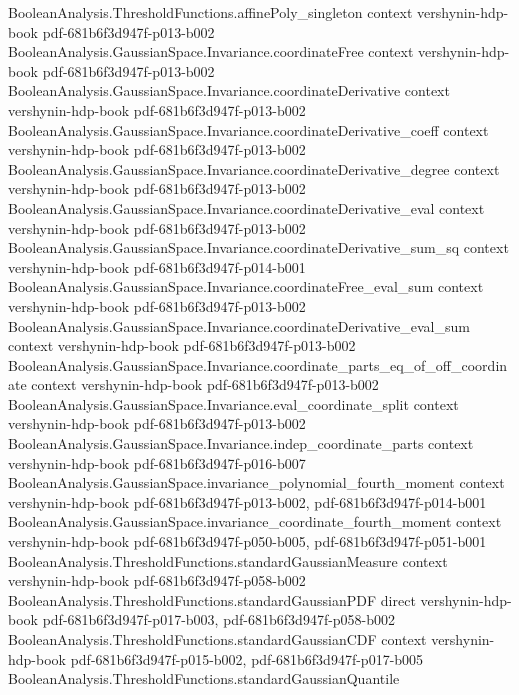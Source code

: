 \begin{theorem}
  {BooleanAnalysis.ThresholdFunctions.affinePoly_singleton}
  {context}
  {vershynin-hdp-book}
  {pdf-681b6f3d947f-p013-b002}
\proofstep
  {BooleanAnalysis.GaussianSpace.Invariance.coordinateFree}
  {context}
  {vershynin-hdp-book}
  {pdf-681b6f3d947f-p013-b002}
\proofstep
  {BooleanAnalysis.GaussianSpace.Invariance.coordinateDerivative}
  {context}
  {vershynin-hdp-book}
  {pdf-681b6f3d947f-p013-b002}
\proofstep
  {BooleanAnalysis.GaussianSpace.Invariance.coordinateDerivative_coeff}
  {context}
  {vershynin-hdp-book}
  {pdf-681b6f3d947f-p013-b002}
\proofstep
  {BooleanAnalysis.GaussianSpace.Invariance.coordinateDerivative_degree}
  {context}
  {vershynin-hdp-book}
  {pdf-681b6f3d947f-p013-b002}
\proofstep
  {BooleanAnalysis.GaussianSpace.Invariance.coordinateDerivative_eval}
  {context}
  {vershynin-hdp-book}
  {pdf-681b6f3d947f-p013-b002}
\proofstep
  {BooleanAnalysis.GaussianSpace.Invariance.coordinateDerivative_sum_sq}
  {context}
  {vershynin-hdp-book}
  {pdf-681b6f3d947f-p014-b001}
\proofstep
  {BooleanAnalysis.GaussianSpace.Invariance.coordinateFree_eval_sum}
  {context}
  {vershynin-hdp-book}
  {pdf-681b6f3d947f-p013-b002}
\proofstep
  {BooleanAnalysis.GaussianSpace.Invariance.coordinateDerivative_eval_sum}
  {context}
  {vershynin-hdp-book}
  {pdf-681b6f3d947f-p013-b002}
\proofstep
  {BooleanAnalysis.GaussianSpace.Invariance.coordinate_parts_eq_of_off_coordinate}
  {context}
  {vershynin-hdp-book}
  {pdf-681b6f3d947f-p013-b002}
\proofstep
  {BooleanAnalysis.GaussianSpace.Invariance.eval_coordinate_split}
  {context}
  {vershynin-hdp-book}
  {pdf-681b6f3d947f-p013-b002}
\proofstep
  {BooleanAnalysis.GaussianSpace.Invariance.indep_coordinate_parts}
  {context}
  {vershynin-hdp-book}
  {pdf-681b6f3d947f-p016-b007}
\proofstep
  {BooleanAnalysis.GaussianSpace.invariance_polynomial_fourth_moment}
  {context}
  {vershynin-hdp-book}
  {pdf-681b6f3d947f-p013-b002,
    pdf-681b6f3d947f-p014-b001}
\proofstep
  {BooleanAnalysis.GaussianSpace.invariance_coordinate_fourth_moment}
  {context}
  {vershynin-hdp-book}
  {pdf-681b6f3d947f-p050-b005,
    pdf-681b6f3d947f-p051-b001}
\proofstep
  {BooleanAnalysis.ThresholdFunctions.standardGaussianMeasure}
  {context}
  {vershynin-hdp-book}
  {pdf-681b6f3d947f-p058-b002}
\proofstep
  {BooleanAnalysis.ThresholdFunctions.standardGaussianPDF}
  {direct}
  {vershynin-hdp-book}
  {pdf-681b6f3d947f-p017-b003,
    pdf-681b6f3d947f-p058-b002}
\proofstep
  {BooleanAnalysis.ThresholdFunctions.standardGaussianCDF}
  {context}
  {vershynin-hdp-book}
  {pdf-681b6f3d947f-p015-b002,
    pdf-681b6f3d947f-p017-b005}
\proofstep
  {BooleanAnalysis.ThresholdFunctions.standardGaussianQuantile}

\end{theorem}
